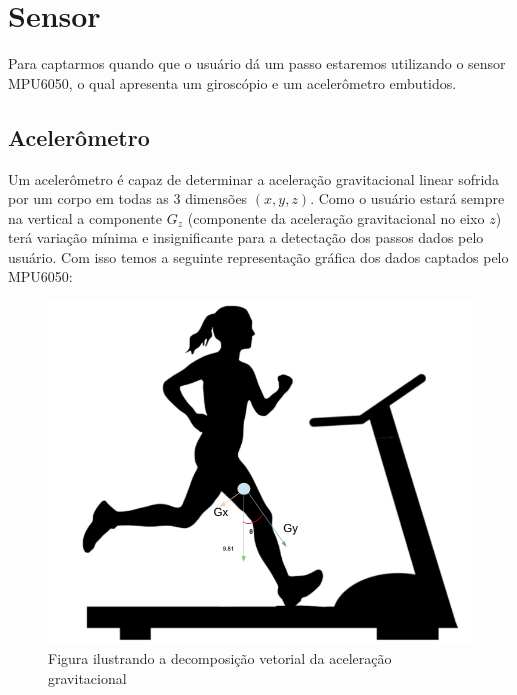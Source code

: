 \documentclass{article}
\date{}
\author{}
\title {\docTitle}
\begin{document}
    
    \maketitle
    \thispagestyle{documentCover}
    
  
    \newpage
    \pagestyle{documentBody}
    \tableofcontents
    \newpage

    \section{Sensor}
        Para captarmos quando que o usuário dá um passo estaremos utilizando o sensor MPU6050, o qual apresenta um
        giroscópio e um acelerômetro embutidos. 
    
        \subsection*{Acelerômetro}
            Um acelerômetro é capaz de determinar a aceleração gravitacional linear sofrida por um corpo em todas as 3
            dimensões $(x,y,z)$. Como o usuário estará sempre na vertical a componente $G_z$ (componente da
            aceleração gravitacional no eixo $z$) terá variação mínima e insignificante para a detectação dos
            passos dados pelo usuário. Com isso temos a seguinte representação gráfica dos dados captados pelo
            MPU6050: 
            
            \begin{figure}[h!]
                \centering
                \includegraphics[width=.7\textwidth]{img/Screen Shot 2020-10-06 at 8.17.44 PM.png}
                \caption{Figura ilustrando a decomposição vetorial da aceleração gravitacional}
            \end{figure}
        
\end{document}
